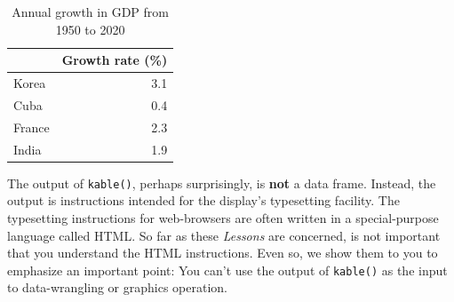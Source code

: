 \documentclass[
  letterpaper,
  DIV=11,
  numbers=noendperiod,
  oneside]{scrartcl}
\begin{document}
\begin{table}

\caption{\label{tab:unnamed-chunk-90}Annual growth in GDP from 1950 to 2020}
\centering
\begin{tabular}[t]{l|r}
\hline
 & Growth rate (\%)\\
\hline
Korea & 3.1\\
\hline
Cuba & 0.4\\
\hline
France & 2.3\\
\hline
India & 1.9\\
\hline
\end{tabular}
\end{table}

The output of \texttt{kable()}, perhaps surprisingly, is \textbf{not} a
data frame. Instead, the output is instructions intended for the
display's typesetting facility. The typesetting instructions for
web-browsers are often written in a special-purpose language called
HTML. So far as these \emph{Lessons} are concerned, is not important
that you understand the HTML instructions. Even so, we show them to you
to emphasize an important point: You can't use the output of
\texttt{kable()} as the input to data-wrangling or graphics operation.
\end{document}
